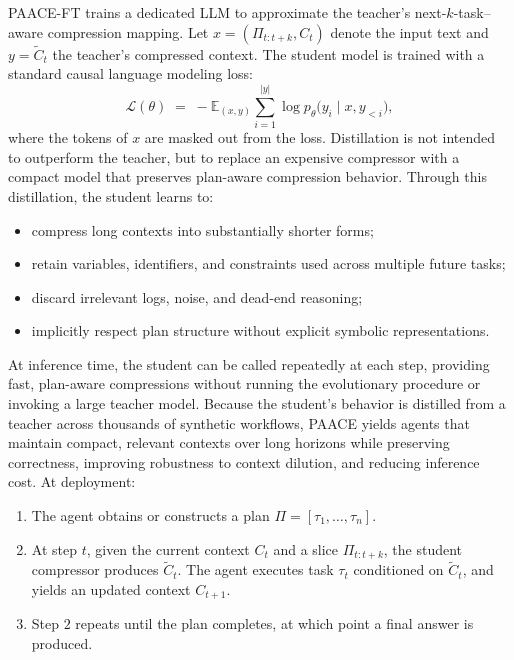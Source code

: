 \documentclass{article}
\theoremstyle{plain}
\theoremstyle{definition}
\theoremstyle{remark}
\begin{document}
PAACE-FT trains a dedicated LLM to approximate the teacher's next-\(k\)-task--aware compression
mapping. Let \(x = (\Pi_{t:t+k}, C_t)\) denote the input text and \(y = \tilde{C}_t\) the teacher's compressed
context. The student model is trained with a standard causal language
modeling loss:
\begin{equation}
    \mathcal{L}(\theta)
    \;=\;
    - \mathbb{E}_{(x,y)}
    \sum_{i=1}^{|y|}
    \log p_\theta\bigl( y_i \mid x, y_{<i} \bigr),
\end{equation}
where the tokens of \(x\) are masked out from the loss.
Distillation is not intended to outperform the teacher, but to replace an
expensive compressor with a compact model that preserves plan-aware
compression behavior.
Through this distillation, the student learns to:
\begin{itemize}[topsep=0pt,itemsep=1pt,parsep=0pt,partopsep=0pt]
    \item compress long contexts into substantially shorter forms;
    \item retain variables, identifiers, and constraints used across multiple future tasks;
    \item discard irrelevant logs, noise, and dead-end reasoning;
    \item implicitly respect plan structure without explicit symbolic representations.
\end{itemize}


At inference time, the student can be called repeatedly at each step, providing fast,
plan-aware compressions without running the evolutionary procedure or invoking a large
teacher model. Because the student's behavior is distilled from a teacher 
across thousands of synthetic workflows, PAACE yields agents that maintain compact, relevant
contexts over long horizons while preserving correctness, improving robustness to context
dilution, and reducing inference cost. At deployment:
\begin{enumerate}[topsep=0pt,itemsep=1pt,parsep=0pt,partopsep=0pt]
    \item The agent obtains or constructs a plan \(\Pi = [\tau_1,\dots,\tau_n]\).
    \item At step \(t\), given the current context \(C_t\) and a slice \(\Pi_{t:t+k}\),
    the student compressor produces \(\tilde{C}_t\). The agent executes task \(\tau_t\)
    conditioned on \(\tilde{C}_t\), and yields an updated context \(C_{t+1}\).
    \item Step \(2\) repeats until the plan completes, at which point a final answer is produced.
\end{enumerate}
\end{document}

